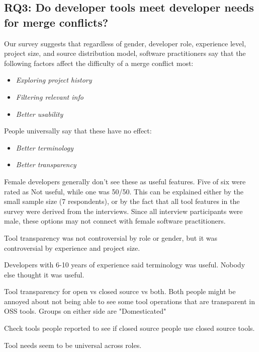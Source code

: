 \subsection{RQ3: Do developer tools meet developer needs for merge conflicts?}


Our survey suggests that regardless of gender, developer role, experience level, project size, and source distribution model, software practitioners say that the following factors affect the difficulty of a merge conflict most:

\begin{itemize}
	\item \textit{Exploring project history}\\
	\item \textit{Filtering relevant info}\\
	\item \textit{Better usability}\\
\end{itemize}

People universally say that these have no effect:
\begin{itemize}
	\item \textit{Better terminology}\\
	\item \textit{Better transparency}\\
\end{itemize}

Female developers generally don’t see these as useful features. Five of six were rated as Not useful, while one was 50/50. This can be explained either by the small sample size (7 respondents), or by the fact that all tool features in the survey were derived from the interviews. Since all interview participants were male, these options may not connect with female software practitioners.

Tool transparency was not controversial by role or gender, but it was controversial by experience and project size.

Developers with 6-10 years of experience said terminology was useful. Nobody else thought it was useful.

Tool transparency for open vs closed source vs both. Both people might be annoyed about not being able to see some tool operations that are transparent in OSS tools. Groups on either side are "Domesticated"

Check tools people reported to see if closed source people use closed source tools.

Tool needs seem to be universal across roles. 


%
%
%
%
